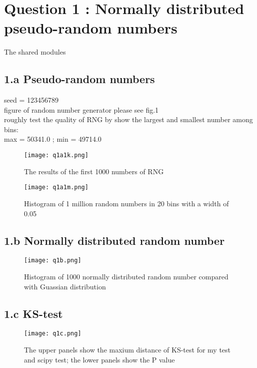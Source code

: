 \section{Question 1 : Normally distributed pseudo-random numbers}
The shared modules


\subsection{1.a  Pseudo-random numbers}


seed =  123456789\\
figure of random number generator please see fig.1 \\
roughly test the quality of RNG by show the largest and smallest number among bins:\\
max =  50341.0 ; min =  49714.0\\

\begin{figure}
  \centering
  \texttt{[image: q1a1k.png]}
  \caption{The results of the first 1000 numbers of RNG }
  \label{fig:n1k}
\end{figure}

\begin{figure}
  \centering
  \texttt{[image: q1a1m.png]}
  \caption{Histogram of 1 million random numbers in 20 bins with a width of 0.05}
  \label{fig:n1m}
\end{figure}


\subsection{1.b Normally distributed random number}


\begin{figure}
  \centering
  \texttt{[image: q1b.png]}
  \caption{Histogram of 1000 normally distributed random number compared with Guassian distribution}
  \label{fig:normal_random}
\end{figure}


\subsection{1.c KS-test}


\begin{figure}
  \centering
  \texttt{[image: q1c.png]}
  \caption{The upper panels show the maxium distance of KS-test for my test and scipy test; 
  the lower panels show the P value}
  \label{fig:ks_test}
\end{figure}

